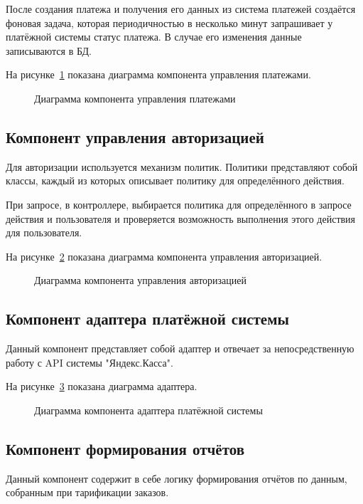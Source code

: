 После создания платежа и получения его данных из система платежей создаётся фоновая задача, которая периодичностью в несколько минут запрашивает у платёжной системы статус платежа. В случае его изменения данные записываются в БД.

На рисунке~\ref{fig:pay_control_scheme} показана диаграмма компонента управления платежами.
\begin{figure}[ht]
  \caption{Диаграмма компонента управления платежами}\label{fig:pay_control_scheme}
\end{figure}

\subsection{Компонент управления авторизацией}\label{sec:subs6}
Для авторизации используется механизм политик. Политики представляют собой классы, каждый из которых описывает политику для определённого действия.


При запросе, в контроллере, выбирается политика для определённого в запросе действия и пользователя и проверяется возможность выполнения этого действия для пользователя.


На рисунке~\ref{fig:authorize_control_scheme} показана диаграмма компонента управления авторизацией.
\begin{figure}[ht]
  \caption{Диаграмма компонента управления авторизацией}\label{fig:authorize_control_scheme}
\end{figure}

\subsection{Компонент адаптера платёжной системы}\label{sec:subs7}
Данный компонент представляет собой адаптер и отвечает за непосредственную работу с API системы "Яндекс.Касса".

На рисунке~\ref{fig:pay_adapter_scheme} показана диаграмма адаптера.
\begin{figure}[ht]
  \caption{Диаграмма компонента адаптера платёжной системы}\label{fig:pay_adapter_scheme}
\end{figure}

\subsection{Компонент формирования отчётов}\label{sec:subs8}
Данный компонент содержит в себе логику формирования отчётов по данным, собранным при тарификации заказов.


